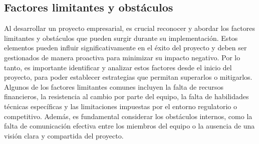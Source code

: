 \subsection{Factores limitantes y obstáculos}
Al desarrollar un proyecto empresarial, es crucial reconocer y abordar los factores limitantes y obstáculos que pueden surgir durante su implementación. Estos elementos pueden influir significativamente en el éxito del proyecto y deben ser gestionados de manera proactiva para minimizar su impacto negativo.
Por lo tanto, es importante identificar y analizar estos factores desde el inicio del proyecto, para poder establecer estrategias que permitan superarlos o mitigarlos. Algunos de los factores limitantes comunes incluyen la falta de recursos financieros, la resistencia al cambio por parte del equipo, la falta de habilidades técnicas específicas y las limitaciones impuestas por el entorno regulatorio o competitivo. Además, es fundamental considerar los obstáculos internos, como la falta de comunicación efectiva entre los miembros del equipo o la ausencia de una visión clara y compartida del proyecto.
